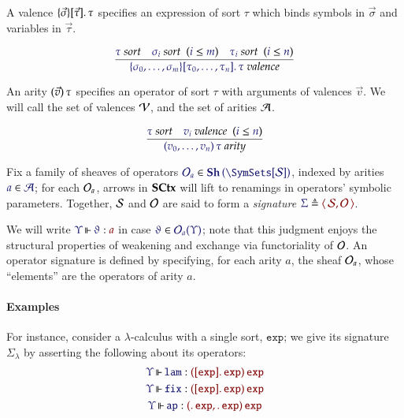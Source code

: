 \documentclass[11pt]{article}
\theoremstyle{definition}
\theoremstyle{remark}
\numberwithin{equation}{section}
\newcommand\SortExp{\mathtt{exp}}
\newcommand\Sheaves[1]{\mathbf{Sh}\left(#1\right)}
\newcommand\SCtxSite{\SymSets[\Sorts]}
\begin{document}
A valence $\MkValence{\vec{\sigma}}{\vec{\tau}}{\tau}$ specifies an expression
of sort $\tau$ which binds symbols in $\vec{\sigma}$ and variables in
$\vec{\tau}$.

\[
  \infer{
    \IsValence{
      \MkValence
        {\sigma_0,\dots,\sigma_m}
        {\tau_0,\dots,\tau_n}
        {\tau}
    }
  }{
    \IsSort{\tau}
&
    \HypJ{\IsSort{\sigma_i}}{\Leq{i}{m}}
&
    \HypJ{\IsSort{\tau_i}}{\Leq{i}{n}}
  }
\]

An arity $(\vec{v})\, \tau$ specifies an operator of sort $\tau$ with
arguments of valences $\vec{v}$. We will call the set of valences $\mathcal{V}$,
and the set of arities $\mathcal{A}$.

\[
  \infer{
    \IsArity{
      \MkArity
        {v_0,\ldots,v_n}
        {\tau}
    }
  }{
    \IsSort{\tau}
&
    \HypJ
      {\IsValence{v_i}}
      {\Leq{i}{n}}
  }
\]


Fix a family of sheaves of operators
$\Member{\Operators_a}{\Sheaves{\SCtxSite}}$, indexed by arities
$\Member{a}{\Arities}$; for each $\mathcal{O}_a$, arrows in $\mathbf{SCtx}$ will lift to
renamings in operators' symbolic parameters. Together, $\mathcal{S}$ and $\mathcal{O}$ are said to form a \emph{signature}
$\Define{\Sigma}{\Pair{\Sorts}{\Operators}}$.

We will write $\IsOperator{\Upsilon}{\vartheta}{a}$ in case
$\Member{\vartheta}{\Operators_a(\Upsilon)}$; note that this judgment enjoys
the structural properties of weakening and exchange via functoriality of
$\mathcal{O}$. An operator signature is defined by specifying, for each arity
$a$, the sheaf $\mathcal{O}_a$, whose ``elements'' are the operators of arity
$a$.


\paragraph{Examples}

For instance, consider a $\lambda$-calculus with a single sort, $\SortExp$; we
give its signature $\Sigma_{\lambda}$ by asserting the following about its
operators:
\begin{gather*}
  \IsOperator{\Upsilon}{\mathtt{lam}}{
    \MkArity{
      \MkValence{}{\SortExp}{\SortExp}
    }{\SortExp}
  }\\
  \IsOperator{\Upsilon}{\mathtt{fix}}{
    \MkArity{
      \MkValence{}{\SortExp}{\SortExp}
    }{\SortExp}
  }\\
  \IsOperator{\Upsilon}{\mathtt{ap}}{
    \MkArity{
      \MkValence{}{}{\SortExp},
      \MkValence{}{}{\SortExp}
    }{\SortExp}
  }
\end{gather*}
\end{document}
